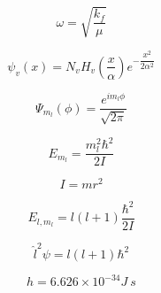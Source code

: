 \documentclass[12pt, letterpaper]{memoir}
\begin{document}
		\begin{minipage}{0.495\textwidth}
		
				
			\begin{equation*}
				\omega=\sqrt{\dfrac{k_f}{\mu}}
			\end{equation*}			
			
			\begin{equation*}
				\psi_v(x) = N_vH_v\left(\dfrac{x}{\alpha}\right)e^{-\dfrac{x^2}{2\alpha^2}}
			\end{equation*}
		
			\begin{equation*}
				\Psi_{m_l}(\phi)=\frac{e^{im_l\phi}}{\sqrt{2\pi}}
			\end{equation*}
			
			\begin{equation*}
				E_{m_l}=\frac{m_l^2\hbar^2}{2I}
			\end{equation*}
			
			\begin{equation*}
				I=mr^2
			\end{equation*}
		
			\begin{equation*}
				E_{l,m_l}=l(l+1)\dfrac{\hbar^2}{2I}
			\end{equation*}
			
			\begin{equation*}
				\hat{l}^2\psi=l(l+1)\hbar^2
			\end{equation*}		
		
			\begin{equation*}
				h = 6.626\times10^{-34}J~s
			\end{equation*}
					
		\end{minipage}
\end{document}
